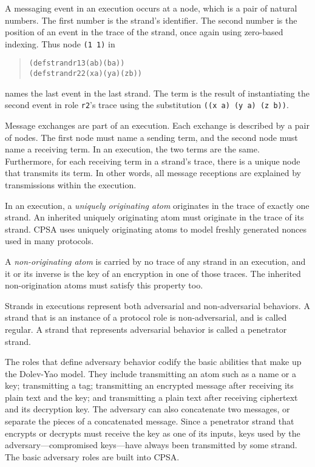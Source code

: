 \documentclass[titlepage,12pt]{article}
\theoremstyle{definition}
\begin{document}
A messaging event in an execution occurs at a node, which is a pair of
natural numbers.  The first number is the strand's identifier.  The
second number is the position of an event in the trace of the
strand, once again using zero-based indexing.  Thus node \texttt{(1~1)}
in
\begin{quote}
\begin{alltt}
(defstrand r1 3 (a b) (b a))
(defstrand r2 2 (x a) (y a) (z b))
\end{alltt}
\end{quote}
names the last event in the last strand.  The term is the
result of instantiating the second event in role \texttt{r2}'s
trace using the substitution \texttt{((x a) (y a) (z b))}.

Message exchanges are part of an execution.  Each exchange is
described by a pair of nodes.  The first node must name a sending
term, and the second node must name a receiving term.  In an
execution, the two terms are the same.  Furthermore, for each
receiving term in a strand's trace, there is a unique node that
transmits its term.  In other words, all message receptions are
explained by transmissions within the execution.

In an execution, a \emph{uniquely originating atom} originates in the
trace of exactly one strand.  An inherited uniquely originating atom
must originate in the trace of its strand.  CPSA uses uniquely
originating atoms to model freshly generated nonces used in many
protocols.

A \emph{non-originating atom} is carried by no trace of any strand in
an execution, and it or its inverse is the key of an encryption in one
of those traces.  The inherited non-origination atoms must satisfy
this property too.

Strands in executions represent both adversarial and non-adversarial
behaviors.  A strand that is an instance of a protocol role is
non-adversarial, and is called regular.  A strand that represents
adversarial behavior is called a penetrator strand.

The roles that define adversary behavior codify the basic abilities
that make up the Dolev-Yao model.  They include transmitting an atom
such as a name or a key; transmitting a tag; transmitting an encrypted
message after receiving its plain text and the key; and transmitting a
plain text after receiving ciphertext and its decryption key.  The
adversary can also concatenate two messages, or separate the pieces of
a concatenated message.  Since a penetrator strand that encrypts or
decrypts must receive the key as one of its inputs, keys used by the
adversary---compromised keys---have always been transmitted by some
strand. The basic adversary roles are built into CPSA.
\end{document}
